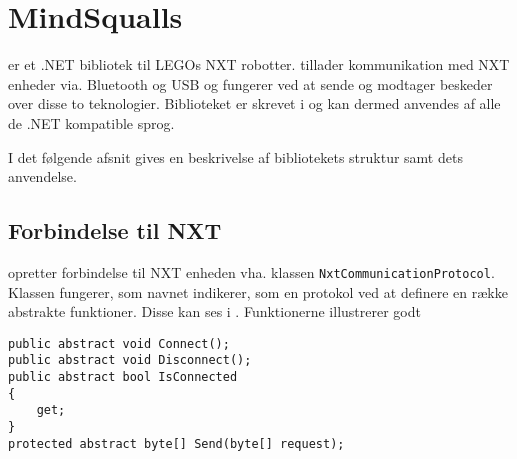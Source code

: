 \section{MindSqualls}
\mindsqualls er et .NET bibliotek til LEGOs NXT robotter.
\mindsqualls tillader kommunikation med NXT enheder via. Bluetooth og USB og fungerer ved at sende og modtager beskeder over disse to teknologier.
Biblioteket er skrevet i \csharp og kan dermed anvendes af alle de .NET kompatible sprog.

I det følgende afsnit gives en beskrivelse af bibliotekets struktur samt dets anvendelse.

\subsection{Forbindelse til NXT}
\mindsqualls opretter forbindelse til NXT enheden vha. klassen \lstinline[style=csharp]!NxtCommunicationProtocol!.
Klassen fungerer, som navnet indikerer, som en protokol ved at definere en række abstrakte funktioner.
Disse kan ses i .
Funktionerne illustrerer godt 
\begin{lstlisting}[style=csharp, label=mindsqualls:abstract, caption={NxtCommunicationProtocol klassen}]
public abstract void Connect();
public abstract void Disconnect();
public abstract bool IsConnected
{
    get;
}
protected abstract byte[] Send(byte[] request);
\end{lstlisting}
